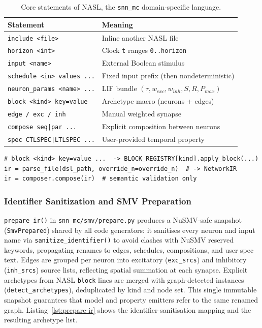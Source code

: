 \documentclass[
]{ceurart}
\begin{document}
\begin{table}
\centering
\caption{Core statements of \textsc{NASL}, the \texttt{snn\_mc} domain-specific language.}
\label{tab:dsl-statements}
\begin{tabular}{@{}ll@{}}
\toprule
\textbf{Statement} & \textbf{Meaning} \\
\midrule
\texttt{include <file>} & Inline another \textsc{NASL} file \\
\texttt{horizon <int>} & Clock \texttt{t} ranges \texttt{0..horizon} \\
\texttt{input <name>} & External Boolean stimulus \\
\texttt{schedule <in> values ...} & Fixed input prefix (then nondeterministic) \\
\texttt{neuron\_params <name> ...} & LIF bundle $(\tau, w_{exc}, w_{inh}, S, R, P_{max})$ \\
\texttt{block <kind> key=value} & Archetype macro (neurons + edges) \\
\texttt{edge / exc / inh} & Manual weighted synapse \\
\texttt{compose seq|par ...} & Explicit composition between neurons \\
\texttt{spec CTLSPEC|LTLSPEC ...} & User-provided temporal property \\
\bottomrule
\end{tabular}
\end{table}

\begin{lstlisting}[style=pythoncode,caption={Parser entry point and block expansion.},label=lst:dsl-syntax]
# block <kind> key=value ...  -> BLOCK_REGISTRY[kind].apply_block(...)
ir = parse_file(dsl_path, override_n=override_n)  # -> NetworkIR
ir = composer.compose(ir)  # semantic validation only
\end{lstlisting}

\subsubsection{Identifier Sanitization and SMV Preparation}

\texttt{prepare\_ir()} in \texttt{snn\_mc/smv/prepare.py} produces a
NuSMV-safe snapshot (\texttt{SmvPrepared}) shared by all code generators: it
sanitises every neuron and input name via \texttt{sanitize\_identifier()} to
avoid clashes with NuSMV reserved keywords, propagating renames to edges,
schedules, compositions, and user spec text. Edges are grouped per neuron
into excitatory (\texttt{exc\_srcs}) and inhibitory (\texttt{inh\_srcs})
source lists, reflecting spatial summation at each synapse. Explicit
archetypes from \textsc{NASL} \texttt{block} lines are merged with
graph-detected instances (\texttt{detect\_archetypes}), deduplicated by kind
and node set. This single immutable snapshot guarantees that model and
property emitters refer to the same renamed graph. Listing~\ref{lst:prepare-ir}
shows the identifier-sanitisation mapping and the resulting archetype list.
\end{document}
